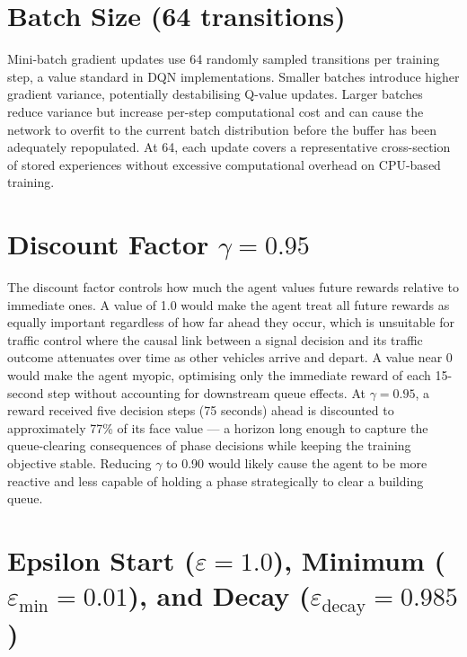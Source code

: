 \section{Batch Size (64 transitions)}

Mini-batch gradient updates use 64 randomly sampled transitions per training step, a value standard in DQN implementations. Smaller batches introduce higher gradient variance, potentially destabilising Q-value updates. Larger batches reduce variance but increase per-step computational cost and can cause the network to overfit to the current batch distribution before the buffer has been adequately repopulated. At 64, each update covers a representative cross-section of stored experiences without excessive computational overhead on CPU-based training.

\section{Discount Factor \( \gamma = 0.95 \)}

The discount factor controls how much the agent values future rewards relative to immediate ones. A value of 1.0 would make the agent treat all future rewards as equally important regardless of how far ahead they occur, which is unsuitable for traffic control where the causal link between a signal decision and its traffic outcome attenuates over time as other vehicles arrive and depart. A value near 0 would make the agent myopic, optimising only the immediate reward of each 15-second step without accounting for downstream queue effects. At \( \gamma = 0.95 \), a reward received five decision steps (75 seconds) ahead is discounted to approximately 77\% of its face value — a horizon long enough to capture the queue-clearing consequences of phase decisions while keeping the training objective stable. Reducing \( \gamma \) to 0.90 would likely cause the agent to be more reactive and less capable of holding a phase strategically to clear a building queue.

\section{Epsilon Start (\( \varepsilon = 1.0 \)), Minimum (\( \varepsilon_{\min} = 0.01 \)), and Decay (\( \varepsilon_{\text{decay}} = 0.985 \))}


